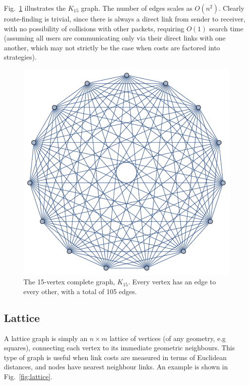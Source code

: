 \documentclass[aps, rmp, twocolumn, amsmath, amssymb, nofootinbib, superscriptaddress, longbibliography, floatfix, table-of-contents, eqsecnum]{revtex4-1}
\begin{document}
Fig.~\ref{fig:complete_graph} illustrates the $K_{15}$ graph. The number of edges scales as $O(n^2)$. Clearly route-finding is trivial, since there is always a direct link from sender to receiver, with no possibility of collisions with other packets, requiring $O(1)$ search time (assuming all users are communicating only via their direct links with one another, which may not strictly be the case when costs are factored into strategies).

\begin{figure}[!htb]
\includegraphics[width=0.7\columnwidth]{K_15}
\caption{The 15-vertex complete graph, $K_{15}$. Every vertex has an edge to every other, with a total of 105 edges.} \label{fig:complete_graph}
\end{figure}

%
%

\subsection{Lattice} 

A lattice graph is simply an \mbox{$n\times m$} lattice of vertices (of any geometry, e.g squares), connecting each vertex to its immediate geometric neighbours. This type of graph is useful when link costs are measured in terms of Euclidean distances, and nodes have nearest neighbour links. An example is shown in Fig.~\ref{fig:lattice}.
\end{document}
